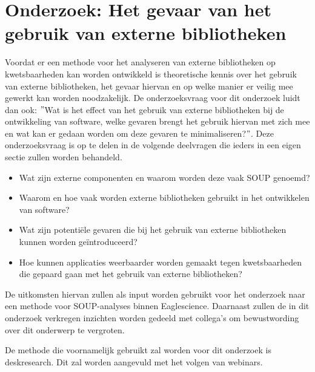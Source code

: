 \chapter{Onderzoek: Het gevaar van het gebruik van externe bibliotheken}\label{ch:externeBibliothekengebruikGevaren}
Voordat er een methode voor het analyseren van externe bibliotheken op kwetsbaarheden kan worden ontwikkeld is theoretische kennis over het gebruik van externe bibliotheken, het gevaar hiervan en op welke manier er veilig mee gewerkt kan worden noodzakelijk. De onderzoeksvraag voor dit onderzoek luidt dan ook: $"$Wat is het effect van het gebruik van externe bibliotheken bij de ontwikkeling van software, welke gevaren brengt het gebruik hiervan met zich mee en wat kan er gedaan worden om deze gevaren te minimaliseren?$"$. Deze onderzoeksvraag is op te delen in de volgende deelvragen die ieders in een eigen sectie zullen worden behandeld.

\begin{itemize}
    \item Wat zijn externe componenten en waarom worden deze vaak SOUP genoemd?
    \item Waarom en hoe vaak worden externe bibliotheken gebruikt in het ontwikkelen van software?
    \item Wat zijn potentiële gevaren die bij het gebruik van externe bibliotheken kunnen worden geïntroduceerd?
    \item Hoe kunnen applicaties weerbaarder worden gemaakt tegen kwetsbaarheden die gepaard gaan met het gebruik van externe bibliotheken?
\end{itemize}
De uitkomsten hiervan zullen als input worden gebruikt voor het onderzoek naar een methode voor SOUP-analyses binnen Eaglescience. Daarnaast zullen de in dit onderzoek verkregen inzichten worden gedeeld met collega's om bewustwording over dit onderwerp te vergroten.

De methode die voornamelijk gebruikt zal worden voor dit onderzoek is deskresearch. Dit zal worden aangevuld met het volgen van webinars.

